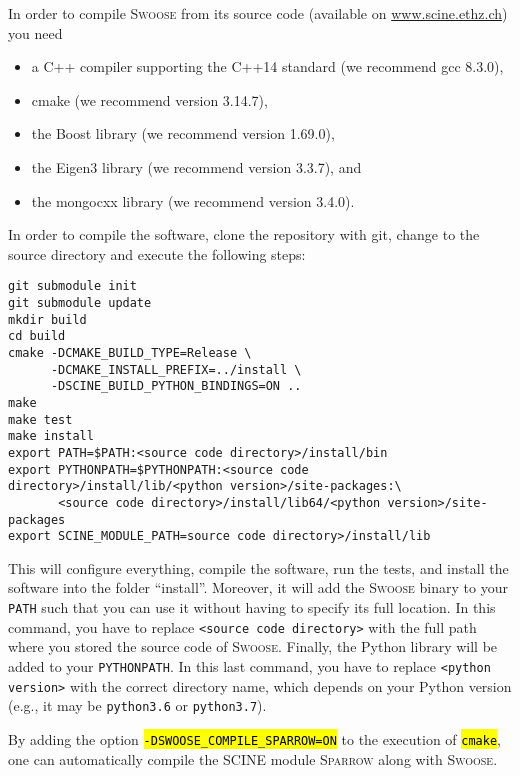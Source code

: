 \documentclass[]{tufte-book}
\begin{document}
In order to compile \textsc{Swoose} from its source code (available on \href{https://scine.ethz.ch/}{www.scine.ethz.ch}) you need
\begin{itemize}
 \item a C++ compiler supporting the C++14 standard (we recommend gcc 8.3.0),
 \item cmake (we recommend version 3.14.7),
 \item the Boost library (we recommend version 1.69.0),
 \item the Eigen3 library (we recommend version 3.3.7), and
 \item the mongocxx library (we recommend version 3.4.0).
\end{itemize}
In order to compile the software, clone the repository with git, change
to the source directory and execute the following steps:
\begin{mdframed}[backgroundcolor=LightSteelBlue!25, userdefinedwidth=18cm, linewidth=0pt]
\begin{verbatim}
git submodule init
git submodule update
mkdir build
cd build
cmake -DCMAKE_BUILD_TYPE=Release \
      -DCMAKE_INSTALL_PREFIX=../install \
      -DSCINE_BUILD_PYTHON_BINDINGS=ON ..
make
make test
make install
export PATH=$PATH:<source code directory>/install/bin
export PYTHONPATH=$PYTHONPATH:<source code directory>/install/lib/<python version>/site-packages:\
       <source code directory>/install/lib64/<python version>/site-packages
export SCINE_MODULE_PATH=source code directory>/install/lib
\end{verbatim}
\end{mdframed}
This will configure everything, compile the software, run the tests, and install the software
into the folder ``install''. Moreover, it will add the \textsc{Swoose} binary to your \texttt{PATH} such that you can use
it without having to specify its full location. In this command, you have to replace \texttt{<source code directory>}
with the full path where you stored the source code of \textsc{Swoose}. Finally, the Python library will be added to your \texttt{PYTHONPATH}. In this last command, you have to replace \texttt{<python version>} with the correct directory name, which depends on your Python version (e.g., it may be \texttt{python3.6} or \texttt{python3.7}).

By adding the option \hl{\:\texttt{-DSWOOSE\_COMPILE\_SPARROW=ON}\:} to the execution of \hl{\:\texttt{cmake}\:}, one can automatically compile the SCINE module \textsc{Sparrow}\cite{sparrow_zenodo} along with \textsc{Swoose}.
\end{document}
